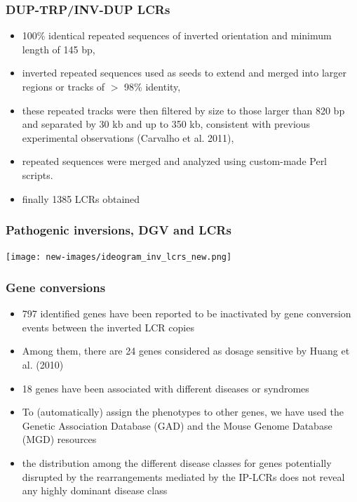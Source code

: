 \begin{frame}\frametitle{DUP-TRP/INV-DUP LCRs}  
\begin{itemize} 
 \item 100\% identical repeated sequences of inverted orientation and minimum length of 145 bp,
 \item inverted repeated sequences used as seeds to extend and merged into larger regions or tracks of $>$ 98\% identity,
 \item these repeated tracks were then filtered by size to those larger than 820 bp and separated by 30 kb and up to 350 kb,
consistent with previous experimental observations (Carvalho et al. 2011),
 \item repeated sequences were merged and analyzed using custom-made Perl scripts.
 \item finally 1385 LCRs obtained 
\end{itemize}
\end{frame}


\begin{frame}\frametitle{Pathogenic inversions, DGV and LCRs}  
	   \texttt{[image: new-images/ideogram\_inv\_lcrs\_new.png]}\\
\end{frame}






\begin{frame}\frametitle{Gene conversions}  
\begin{itemize} 
 \item 797 identified genes have been reported to be inactivated by gene conversion
events between the inverted LCR copies
 \item Among them, there are 24 genes considered as dosage sensitive by Huang et al.
(2010)
 \item 18 genes have been associated with different diseases or syndromes
\item To (automatically) assign the phenotypes to other genes, we have used the Genetic
Association Database (GAD) and the Mouse Genome Database (MGD) resources
\item the distribution among the different disease classes for genes potentially disrupted by the rearrangements mediated by the IP-LCRs does not reveal any
highly dominant disease class
\end{itemize}
\end{frame}



